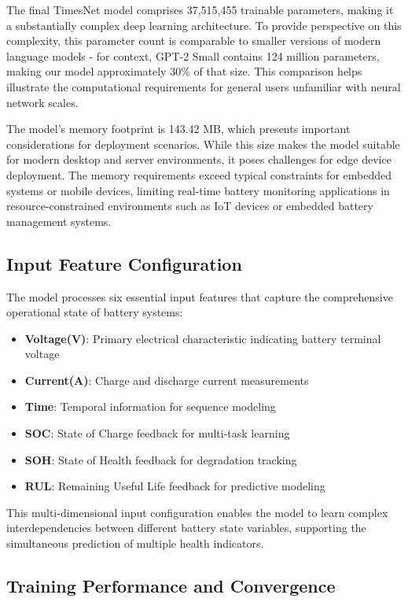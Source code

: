 The final TimesNet model comprises 37,515,455 trainable parameters, making it a substantially complex deep learning architecture. To provide perspective on this complexity, this parameter count is comparable to smaller versions of modern language models - for context, GPT-2 Small contains 124 million parameters, making our model approximately 30\% of that size. This comparison helps illustrate the computational requirements for general users unfamiliar with neural network scales.

The model's memory footprint is 143.42 MB, which presents important considerations for deployment scenarios. While this size makes the model suitable for modern desktop and server environments, it poses challenges for edge device deployment. The memory requirements exceed typical constraints for embedded systems or mobile devices, limiting real-time battery monitoring applications in resource-constrained environments such as IoT devices or embedded battery management systems.

\subsection{Input Feature Configuration}
\label{subsec:input_features}

The model processes six essential input features that capture the comprehensive operational state of battery systems:

\begin{itemize}
    \item \textbf{Voltage(V)}: Primary electrical characteristic indicating battery terminal voltage
    \item \textbf{Current(A)}: Charge and discharge current measurements
    \item \textbf{Time}: Temporal information for sequence modeling
    \item \textbf{SOC}: State of Charge feedback for multi-task learning
    \item \textbf{SOH}: State of Health feedback for degradation tracking
    \item \textbf{RUL}: Remaining Useful Life feedback for predictive modeling
\end{itemize}

This multi-dimensional input configuration enables the model to learn complex interdependencies between different battery state variables, supporting the simultaneous prediction of multiple health indicators.

\subsection{Training Performance and Convergence}
\label{subsec:training_performance}

